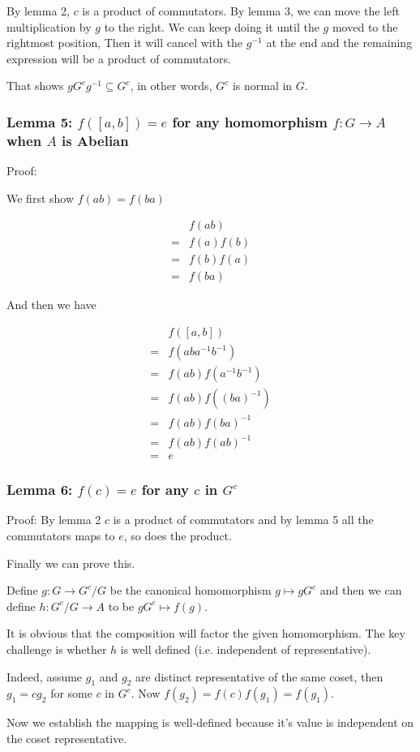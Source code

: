 By lemma 2, $c$ is a product of commutators. By lemma 3, we can move the left multiplication by $g$ to the right. We can keep doing it until the $g$ moved to the rightmost position, Then it will cancel with the $g^{-1}$ at the end and the remaining expression will be a product of commutators.

That shows $ gG^cg^{-1} \subseteq G^c $, in other words, $G^c$ is normal in $G$.

\subsubsection*{Lemma 5: $f([a,b]) = e$ for any homomorphism $ f: G \to A $ when $A$ is Abelian}

Proof: 

We first show $ f(ab) = f(ba) $

\begin{align*}
   & f(ab) \\
  =& f(a)f(b) \\
  =& f(b)f(a) \\
  =& f(ba)
\end{align*}

And then we have

\begin{align*}
   & f([a,b]) \\
  =& f(aba^{-1}b^{-1}) \\
  =& f(ab)f(a^{-1}b^{-1}) \\
  =& f(ab)f((ba)^{-1}) \\
  =& f(ab)f(ba)^{-1} \\
  =& f(ab)f(ab)^{-1} \\
  =& e
\end{align*}

\subsubsection*{Lemma 6: $f(c) = e$ for any $c$ in $G^c$}

Proof: By lemma 2 $c$ is a product of commutators and by lemma 5 all the commutators maps to $e$, so does the product.

Finally we can prove this.

Define $g: G \to G^c/G$ be the canonical homomorphism $g \mapsto gG^c$ and then we can define $h: G^c/G \to A$ to be $ gG^c \mapsto f(g) $.

It is obvious that the composition will factor the given homomorphism. The key challenge is whether $h$ is well defined (i.e. independent of representative).

Indeed, assume $g_1$ and $g_2$ are distinct representative of the same coset, then $g_1 = cg_2$ for some $c$ in $G^c$. Now $ f(g_2) = f(c) f(g_1) = f(g_1) $.

Now we establish the mapping is well-defined because it's value is independent on the coset representative.